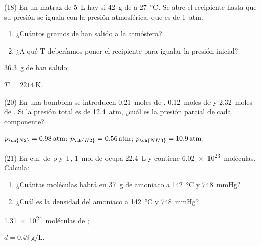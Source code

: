 \documentclass[10pt]{article}
\begin{document}
\begin{multicols}{2}
\begin{exercise}
  (18) En un matraz de \SI{5}{\liter} hay si \SI{42}{\gram} de  a \SI{27}{\celsius}. Se abre el recipiente
  hasta que su presión se iguala con la presión atmosférica,
  que es de \SI{1}{atm}.
  \begin{enumerate}
    \item ¿Cuántos gramos de  han salido a la atmósfera?
    \item ¿A qué T deberíamos poner el recipiente para igualar la presión inicial?
  \end{enumerate}
\end{exercise}
\begin{solution}
  \begin{enumerate*}
    \item \SI{36.3}{\gram} de  han salido;
    \item \( T' = \SI{2214}{\kelvin} \).
  \end{enumerate*}
\end{solution}

\begin{exercise}
  (20) En una bombona se introducen \SI{0.21}{moles} de , \SI{0.12}{moles}
  de  y \SI{2.32}{moles} de . Si la presión total es de \SI{12.4}{atm}, ¿cuál es la presión parcial de cada componente?
\end{exercise}
\begin{solution}
  \( p_{\ch{N2}} = \SI{0.98}{atm} \); \( p_{\ch{H2}} = \SI{0.56}{atm} \); \( p_{\ch{NH3}} = \SI{10.9}{atm} \).
\end{solution}

\begin{exercise}
  (21) En c.n. de p y T, \SI{1}{mol} de  ocupa \SI{22.4}{\liter} y contiene \SI{6.02e23}{moléculas}. Calcula:
  \begin{enumerate}
    \item ¿Cuántas moléculas habrá en \SI{37}{\gram} de amoniaco a \SI{142}{\celsius} y \SI{748}{\mmHg}?
    \item ¿Cuál es la densidad del amoniaco a \SI{142}{\celsius} y \SI{748}{\mmHg}?
  \end{enumerate}
\end{exercise}
\begin{solution}
  \begin{enumerate*}
    \item \SI{1.31e24}{moléculas} de ; \item \( d = \SI{0.49}{\gram\per\liter} \).
  \end{enumerate*}
\end{solution}


\end{multicols}
\end{document}
